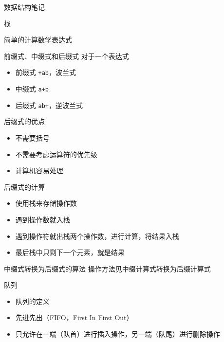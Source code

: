 \documentclass[
  ignorenonframetext,
]{beamer}
\providecommand{\tightlist}{%
  \setlength{\itemsep}{0pt}\setlength{\parskip}{0pt}}
\begin{document}
\begin{frame}[fragile]{数据结构笔记}
\begin{block}{栈}
\begin{block}{简单的计算数学表达式}
\protect{}\label{ux7b80ux5355ux7684ux8ba1ux7b97ux6570ux5b66ux8868ux8fbeux5f0f}
\begin{block}{前缀式、中缀式和后缀式}
\protect{}\label{ux524dux7f00ux5f0fux4e2dux7f00ux5f0fux548cux540eux7f00ux5f0f}
对于一个表达式 {}

\begin{itemize}
\tightlist
\item
  前缀式 \texttt{+ab}，波兰式
\item
  中缀式 \texttt{a+b}
\item
  后缀式 \texttt{ab+}，逆波兰式
\end{itemize}
\end{block}

\begin{block}{后缀式的优点}
\protect{}\label{ux540eux7f00ux5f0fux7684ux4f18ux70b9}
\begin{itemize}
\tightlist
\item
  不需要括号
\item
  不需要考虑运算符的优先级
\item
  计算机容易处理
\end{itemize}
\end{block}

\begin{block}{后缀式的计算}
\protect{}\label{ux540eux7f00ux5f0fux7684ux8ba1ux7b97}
\begin{itemize}
\tightlist
\item
  使用栈来存储操作数
\item
  遇到操作数就入栈
\item
  遇到操作符就出栈两个操作数，进行计算，将结果入栈
\item
  最后栈中只剩下一个元素，就是结果
\end{itemize}
\end{block}

\begin{block}{中缀式转换为后缀式的算法}
\protect{}\label{ux4e2dux7f00ux5f0fux8f6cux6362ux4e3aux540eux7f00ux5f0fux7684ux7b97ux6cd5}
操作方法见中缀计算式转换为后缀计算式
\end{block}
\end{block}
\end{block}

\begin{block}{队列}
\protect{}\label{ux961fux5217}
\begin{itemize}
\item
  队列的定义
\item
  先进先出（FIFO，First In First Out）
\item
  只允许在一端（队首）进行插入操作，另一端（队尾）进行删除操作
\end{itemize}


\end{block}
\end{frame}
\end{document}
